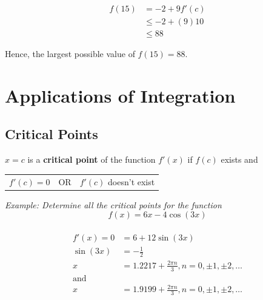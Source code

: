 \documentclass{article}
\begin{document}
            \begin{align*}
                f(15) &= -2 + 9f'(c) \\
                &\leq -2 + (9)10 \\
                &\leq 88
            \end{align*}

            \noindent Hence, the largest possible value of $f(15)=88$.

    \pagebreak

    \section{Applications of Integration}

        \subsection{Critical Points}
            $x=c$ is a \textbf{critical point} of the function $f'(x)$ if $f(c)$ exists and \\

            \begin{center}
                \begin{tabular}{ccc}
                    $f'(c) = 0$ & OR & $f'(c)$ doesn't exist
                \end{tabular}
            \end{center}

            \noindent \color{blue} \textit{Example: Determine all the critical points for the function} \\

            \begin{equation*}
                f(x) = 6x - 4\cos{(3x)}
            \end{equation*} \color{black} \\

            \begin{align*}
                f'(x) = 0 &= 6 + 12\sin{(3x)} \\
                \sin{(3x)} &= -\frac{1}{2} \\
                x &= 1.2217+\frac{2\pi n}{3}, n=0,\pm 1,\pm 2,\dots \\
                \text{and} \\
                x &= 1.9199+\frac{2\pi n}{3}, n=0,\pm 1,\pm 2,\dots
            \end{align*}
\end{document}
